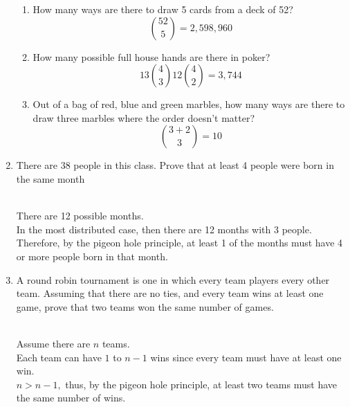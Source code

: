 \documentclass[basic, header]{nosvagor-notes}
\begin{document}
\begin{enumerate}
\begin{enumerate}
      \item How many ways are there to draw 5 cards from a deck of 52?
        \[%
          {52 \choose 5} = 2,598,960
        \]%

      \item How many possible full house hands are there in poker?
        \[%
          13{4 \choose 3}12{4 \choose 2} = 3,744
        \]%

      \item Out of a bag of red, blue and green marbles, how many ways are
        there to draw three marbles where the order doesn't matter?
        \[%
          {3+2 \choose 3}  = 10
        \]%

    \end{enumerate}

  \newpage %

  \item There are 38 people in this class. Prove that at least 4 people were
    born in the same month

    \\
    There are 12 possible months.\\
    In the most distributed case, then there are 12 months with 3 people.\\
    Therefore, by the pigeon hole principle, at least 1 of the months must have
    4 or more people born in that month.\tqed

  \item A round robin tournament is one in which every team players every
    other team. Assuming that there are no ties, and every team wins at least
    one game, prove that two teams won the same number of games.

    \\
    Assume there are \(n\) teams. \\
    Each team can have \(1\) to \(n-1\) wins since every team must have at
    least one win.\\
    \(n > n-1,\) thus, by the pigeon hole principle, at least two teams must
    have the same number of wins.\tqed


\end{enumerate}
\end{document}
